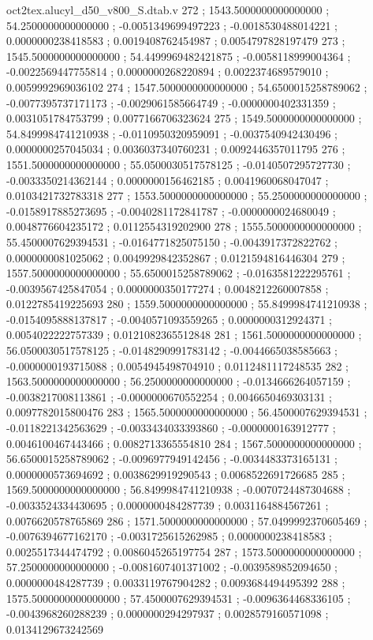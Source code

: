 \begin{filecontents}[overwrite]{oct2tex.alucyl_d50_v800_S.dtab.v}
272 ; 1543.5000000000000000 ; 54.2500000000000000 ; -0.0051349699497223 ; -0.0018530488014221 ; 0.0000000238418583 ; 0.0019408762454987 ; 0.0054797828197479
273 ; 1545.5000000000000000 ; 54.4499969482421875 ; -0.0058118999004364 ; -0.0022569447755814 ; 0.0000000268220894 ; 0.0022374689579010 ; 0.0059992969036102
274 ; 1547.5000000000000000 ; 54.6500015258789062 ; -0.0077395737171173 ; -0.0029061585664749 ; -0.0000000402331359 ; 0.0031051784753799 ; 0.0077166706323624
275 ; 1549.5000000000000000 ; 54.8499984741210938 ; -0.0110950320959091 ; -0.0037540942430496 ; 0.0000000257045034 ; 0.0036037340760231 ; 0.0092446357011795
276 ; 1551.5000000000000000 ; 55.0500030517578125 ; -0.0140507295727730 ; -0.0033350214362144 ; 0.0000000156462185 ; 0.0041960068047047 ; 0.0103421732783318
277 ; 1553.5000000000000000 ; 55.2500000000000000 ; -0.0158917885273695 ; -0.0040281172841787 ; -0.0000000024680049 ; 0.0048776604235172 ; 0.0112554319202900
278 ; 1555.5000000000000000 ; 55.4500007629394531 ; -0.0164771825075150 ; -0.0043917372822762 ; 0.0000000081025062 ; 0.0049929842352867 ; 0.0121594816446304
279 ; 1557.5000000000000000 ; 55.6500015258789062 ; -0.0163581222295761 ; -0.0039567425847054 ; 0.0000000350177274 ; 0.0048212260007858 ; 0.0122785419225693
280 ; 1559.5000000000000000 ; 55.8499984741210938 ; -0.0154095888137817 ; -0.0040571093559265 ; 0.0000000312924371 ; 0.0054022222757339 ; 0.0121082365512848
281 ; 1561.5000000000000000 ; 56.0500030517578125 ; -0.0148290991783142 ; -0.0044665038585663 ; -0.0000000193715088 ; 0.0054945498704910 ; 0.0112481117248535
282 ; 1563.5000000000000000 ; 56.2500000000000000 ; -0.0134666264057159 ; -0.0038217008113861 ; -0.0000000670552254 ; 0.0046650469303131 ; 0.0097782015800476
283 ; 1565.5000000000000000 ; 56.4500007629394531 ; -0.0118221342563629 ; -0.0033434033393860 ; -0.0000000163912777 ; 0.0046100467443466 ; 0.0082713365554810
284 ; 1567.5000000000000000 ; 56.6500015258789062 ; -0.0096977949142456 ; -0.0034483373165131 ; 0.0000000573694692 ; 0.0038629919290543 ; 0.0068522691726685
285 ; 1569.5000000000000000 ; 56.8499984741210938 ; -0.0070724487304688 ; -0.0033524334430695 ; 0.0000000484287739 ; 0.0031164884567261 ; 0.0076620578765869
286 ; 1571.5000000000000000 ; 57.0499992370605469 ; -0.0076394677162170 ; -0.0031725615262985 ; 0.0000000238418583 ; 0.0025517344474792 ; 0.0086045265197754
287 ; 1573.5000000000000000 ; 57.2500000000000000 ; -0.0081607401371002 ; -0.0039589852094650 ; 0.0000000484287739 ; 0.0033119767904282 ; 0.0093684494495392
288 ; 1575.5000000000000000 ; 57.4500007629394531 ; -0.0096364468336105 ; -0.0043968260288239 ; 0.0000000294297937 ; 0.0028579160571098 ; 0.0134129673242569

\end{filecontents}
